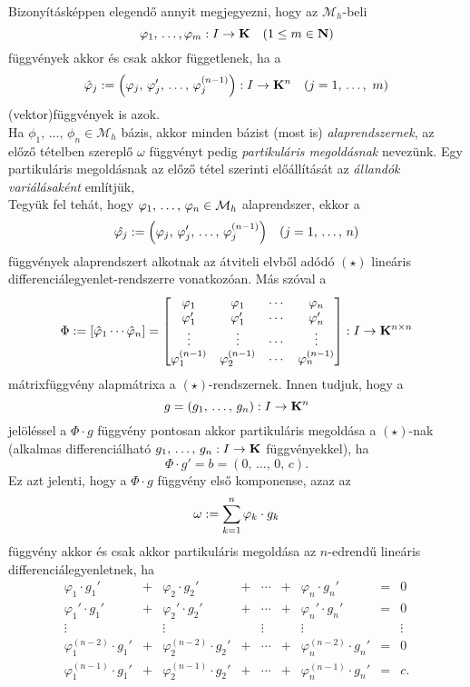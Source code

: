 Bizonyításképpen elegendő annyit megjegyezni, hogy az $\mathcal{M}_h$-beli
\[
	\varphi_1, \, \dots, \varphi_m : I \to \mathbf{K} \quad (1 \leq m \in \mathbf{N})
\]
függvények akkor és csak akkor függetlenek, ha a
\[
	\hat{\p}_j := \BB{ \p_j, \, \p_j', \, \dots, \, \p_j^{(n-1)} } : I \to \K^n \quad (j = 1, \, \dots, \ m)
\]
(vektor)függvények is azok.\\

Ha $\phi_1, \, \dots, \, \phi_n \in \mathcal{M}_h$ bázis, akkor minden bázist (most is) \textit{alaprendszernek}, az előző tételben szereplő $\omega$ függvényt pedig \textit{partikuláris megoldásnak} nevezünk. Egy partikuláris megoldásnak az előző tétel szerinti előállítását az \textit{állandók variálásaként} említjük, \\

Tegyük fel tehát, hogy $\varphi_1, \, \dots, \, \varphi_n \in \mathcal{M}_h$ alaprendszer, ekkor a
\[
	\hat{\varphi_j} := \Big(  \varphi_j, \, \varphi_j', \, \dots, \, \varphi_j^{(n-1)}  \Big) \quad (j = 1, \, \dots, \, n)
\]
függvények alaprendszert alkotnak az átviteli elvből adódó $(\star)$ lineáris differenciálegyenlet-rendszerre vonatkozóan. Más szóval a
\[
	\Phi := [ \hat{\varphi}_1  \cdots \hat{\varphi}_n] = \begin{bmatrix}
		\varphi_1   & \varphi_1  & \cdots & \varphi_n \\
		\varphi'_1  & \varphi'_1 & \cdots & \varphi'_n \\
		\vdots & \vdots & \cdots & \vdots \\
		\varphi_1^{(n-1)} & \varphi_2^{(n-1)} & \cdots & \varphi_n^{(n-1)}
	\end{bmatrix} : I \to \mathbf{K}^{n \times n}
\]
mátrixfüggvény alapmátrixa a $(\star)$-rendszernek. Innen tudjuk, hogy a
\[
	g = (g_1, \, \dots, \, g_n) : I \to \mathbf{K}^n
\]
jelöléssel a $\Phi \cdot g$ függvény pontosan akkor partikuláris megoldása a $(\star)$-nak (alkalmas differenciálható $g_1, \, \dots, \, g_n : I \to \mathbf{K}$ függvényekkel), ha
\[
	\Phi \cdot g' = b = (0, \, \dots, \, 0, \, c).
\]
Ez azt jelenti, hogy a $\Phi \cdot g$ függvény első komponense, azaz az
\[
	\omega := \sum_{k=1}^n \varphi_k \cdot g_k
\]
függvény akkor és csak akkor partikuláris megoldása az $n$-edrendű lineáris differenciálegyenletnek, ha
\[
\begin{array}{ccccccccccc}
	\varphi_1 \cdot g_1' &+& \varphi_2 \cdot g_2' &+& \cdots &+& \varphi_n \cdot g_n' &=& 0 \\
	\varphi_1' \cdot g_1' &+& \varphi_2' \cdot g_2' &+& \cdots &+& \varphi_n' \cdot g_n' &=& 0 \\
	\vdots & & \vdots & & \vdots & & \vdots & & \vdots \\
	\varphi_1^{(n-2)} \cdot g_1' &+& \varphi_2^{(n-2)} \cdot g_2' &+& \cdots &+& \varphi_n^{(n-2)} \cdot g_n' &=& 0 \\
	\varphi_1^{(n-1)} \cdot g_1' &+& \varphi_2^{(n-1)} \cdot g_2' &+& \cdots &+& \varphi_n^{(n-1)} \cdot g_n' &=& c.
\end{array}
\]
